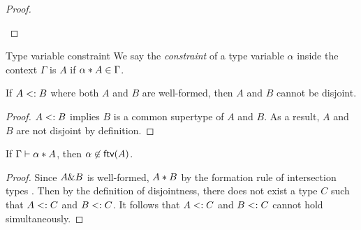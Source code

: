\begin{proof}
\begin{itemize}
  \end{itemize}
\end{proof}

\begin{definition}{Type variable constraint}
  We say the \emph{constraint} of a type variable $\alpha$ inside the context
  $\Gamma$ is $A$ if $\alpha * A \in \Gamma$.
\end{definition}

\begin{lemma}
If $A <: B$ where both $A$ and $B$ are well-formed, then $A$ and $B$ cannot be disjoint.
\end{lemma}

\begin{proof}
$A <: B$ implies $B$ is a common supertype of $A$ and $B$. As a result, $A$ and $B$ are not disjoint by definition.
\end{proof}


\begin{lemma} \label{free-var-disjoint-bounds}
  If $\Gamma \vdash \alpha * A$, then $\alpha \not \in \textsf{ftv}(A)$.
\end{lemma}

\begin{proof}
Since $A \& B$ is well-formed, $A * B$ by the formation rule of intersection types . Then by the definition of disjointness, there does not exist a type $C$ such that $A <: C$ and $B <: C$. It follows that $A <: C$ and $B <: C$ cannot hold simultaneously.
\end{proof}

